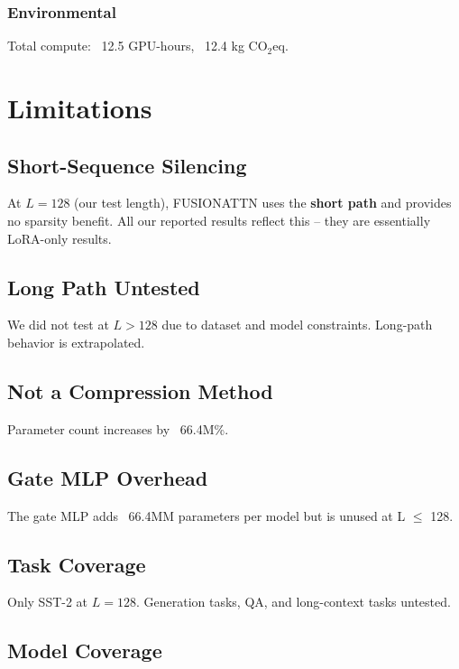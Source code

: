 \subsubsection{Environmental}
Total compute: ~12.5 GPU-hours, ~12.4 kg CO$_2$eq.



\section{Limitations}

\subsection{Short-Sequence Silencing}

At $L = 128$ (our test length), FUSIONATTN uses the \textbf{short path} and 
provides no sparsity benefit. All our reported results reflect this -- they 
are essentially LoRA-only results.

\subsection{Long Path Untested}

We did not test at $L > 128$ due to dataset and model constraints. Long-path 
behavior is extrapolated.

\subsection{Not a Compression Method}

Parameter count increases by ~66.4M\%.

\subsection{Gate MLP Overhead}

The gate MLP adds ~66.4MM parameters per model but is unused at 
L $\le$ 128.

\subsection{Task Coverage}

Only SST-2 at $L = 128$. Generation tasks, QA, and long-context tasks 
untested.

\subsection{Model Coverage}

